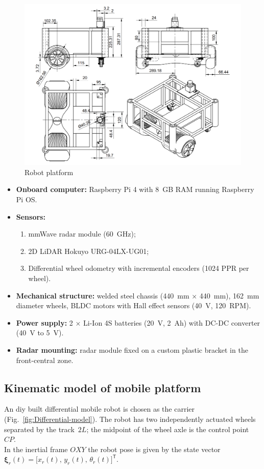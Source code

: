\begin{figure}[H]
    \centering
    \includegraphics[width=0.6\linewidth]{Src/images/Blackbox.png}
    \caption{Robot platform}
    \label{fig:Robot}
\end{figure}

\begin{itemize}
    \item \textbf{Onboard computer:} Raspberry Pi 4 with 8~GB RAM running Raspberry Pi OS.
    
    \item \textbf{Sensors:}
    \begin{enumerate}
        \item mmWave radar module (60~GHz);
        \item 2D LiDAR Hokuyo URG-04LX-UG01;
        \item Differential wheel odometry with incremental encoders (1024 PPR per wheel).
    \end{enumerate}

    \item \textbf{Mechanical structure:} welded steel chassis (440~mm × 440~mm), 162~mm diameter wheels, BLDC motors with Hall effect sensors (40~V, 120~RPM).
    \item \textbf{Power supply:} 2 × Li-Ion 4S batteries (20~V, 2~Ah) with DC-DC converter (40~V to 5~V).
    \item \textbf{Radar mounting:} radar module fixed on a custom plastic bracket in the front-central zone.
\end{itemize}




\subsection{Kinematic model of mobile platform}
An diy built differential mobile robot is chosen as the carrier
(Fig.~\ref{fig:Differential-model}).
The robot has two independently actuated wheels separated by the
track~\(2L\); the midpoint of the wheel axle is the control
point~\(CP\).\\
In the inertial frame \(OXY\) the robot pose is given by the state vector
\(\boldsymbol{\xi}_r(t)=\bigl[x_r(t),\,y_r(t),\,\theta_r(t)\bigr]^{\mathsf T}\).

